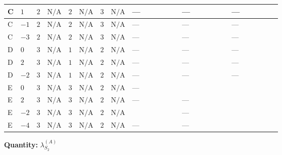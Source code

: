 \documentclass[8pt]{article}
\begin{document}
\begin{landscape}
\begin{longtable}{@{}llcccccc >{\raggedright\arraybackslash}p{0.21\linewidth} >{\raggedright\arraybackslash}p{0.21\linewidth} >{\raggedright\arraybackslash}p{0.21\linewidth}@{}}
\midrule
C & $1$ & $2$ & $\text{N/A}$ & $2$ & $\text{N/A}$ & $3$ & $\text{N/A}$ & --- & --- & --- \\
\midrule
C & $-1$ & $2$ & $\text{N/A}$ & $2$ & $\text{N/A}$ & $3$ & $\text{N/A}$ & --- & --- & --- \\
\midrule
C & $-3$ & $2$ & $\text{N/A}$ & $2$ & $\text{N/A}$ & $3$ & $\text{N/A}$ & --- & --- & --- \\
\midrule
D & $0$ & $3$ & $\text{N/A}$ & $1$ & $\text{N/A}$ & $2$ & $\text{N/A}$ & --- & --- & --- \\
\midrule
D & $2$ & $3$ & $\text{N/A}$ & $1$ & $\text{N/A}$ & $2$ & $\text{N/A}$ & --- & --- & --- \\
\midrule
D & $-2$ & $3$ & $\text{N/A}$ & $1$ & $\text{N/A}$ & $2$ & $\text{N/A}$ & --- & --- & --- \\
\midrule
E & $0$ & $3$ & $\text{N/A}$ & $3$ & $\text{N/A}$ & $2$ & $\text{N/A}$ & --- & \scriptsize\adjustbox{max width=\linewidth}{$\begin{gathered} -\frac{4}{3} {\lambda_{X_{5}}^{(2)}} \left({\lambda_{X_{5}}^{(2)}}\right)^{*}\end{gathered}$} & \scriptsize\adjustbox{max width=\linewidth}{$\begin{gathered} +12 {\lambda_{12}^{(A)}}^2\end{gathered}$} \\
\midrule
E & $2$ & $3$ & $\text{N/A}$ & $3$ & $\text{N/A}$ & $2$ & $\text{N/A}$ & --- & --- & \scriptsize\adjustbox{max width=\linewidth}{$\begin{gathered} +12 {\lambda_{12}^{(A)}}^2\end{gathered}$} \\
\midrule
E & $-2$ & $3$ & $\text{N/A}$ & $3$ & $\text{N/A}$ & $2$ & $\text{N/A}$ & \scriptsize\adjustbox{max width=\linewidth}{$\begin{gathered} -\frac{8}{3} {\lambda_{X_{16}}} \left({\lambda_{X_{16}}}\right)^{*}\end{gathered}$} & --- & \scriptsize\adjustbox{max width=\linewidth}{$\begin{gathered} +12 {\lambda_{12}^{(A)}}^2\end{gathered}$} \\
\midrule
E & $-4$ & $3$ & $\text{N/A}$ & $3$ & $\text{N/A}$ & $2$ & $\text{N/A}$ & --- & --- & \scriptsize\adjustbox{max width=\linewidth}{$\begin{gathered} +12 {\lambda_{12}^{(A)}}^2\end{gathered}$} \\
\midrule
\bottomrule
\end{longtable}
\clearpage
\noindent\textbf{Quantity: }$\lambda_{S_2}^{(A)}$\par\smallskip

\end{landscape}
\end{document}
